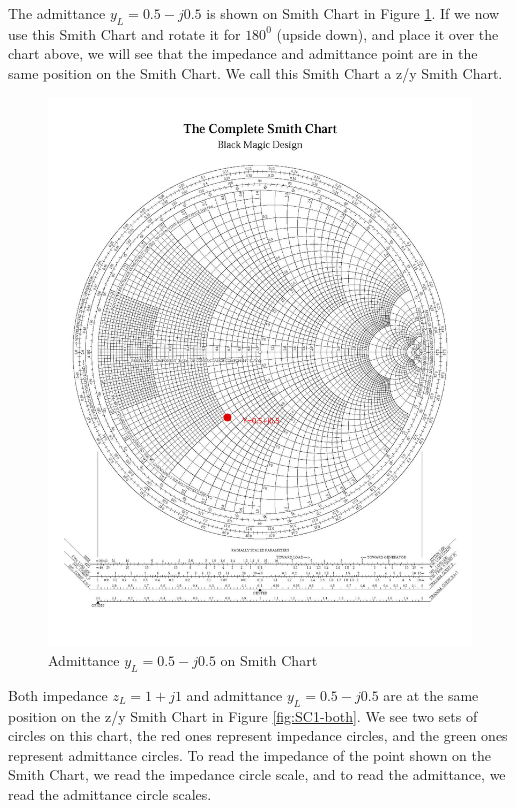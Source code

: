 \documentclass{ximera}
\begin{document}
\begin{example}
The admittance $y_L=0.5-j0.5$ is shown on Smith Chart in Figure \ref{fig:SC1-adm}. If we now use this Smith Chart and rotate it for $180^0$ (upside down), and place it over the chart above, we will see that the impedance and admittance point are in the same position on the Smith Chart. We call this Smith Chart a z/y Smith Chart. 

\begin{figure}[htbp]
\begin{center}
\includegraphics[scale=0.1]{../jpg/Ychart-01.jpg}
\end{center}
\caption{Admittance $y_L=0.5-j0.5$ on Smith Chart} \label{fig:SC1-adm}
\end{figure}


Both impedance  $z_L=1+j1$ and admittance $y_L=0.5-j0.5$ are at the same position on the z/y Smith Chart in Figure \ref{fig:SC1-both}. We see two sets of circles on this chart, the red ones represent impedance circles, and the green ones represent admittance circles. To read the impedance of the point shown on the Smith Chart, we read the impedance circle scale, and to read the admittance, we read the admittance circle scales.



\end{example}
\end{document}
